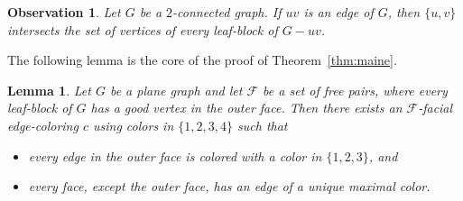 \documentclass[a4paper,12pt]{article}
\newtheorem{lemma}{Lemma}
\newtheorem{observation}{Observation}
\begin{document}
\begin{observation}
	\label{obs:leaves}
	Let $G$ be a $2$-connected graph.
	If $uv$ is an edge of $G$, then $\{u,v\}$ intersects the set of vertices of every leaf-block of $G-uv$.
\end{observation}

The following lemma is the core of the proof of Theorem~\ref{thm:maine}.

\begin{lemma}
	\label{lem:maine}
	Let $G$ be a plane graph and let $\mathcal{F}$ be a set of free pairs,
	where every leaf-block of $G$ has a good vertex in the outer face.
	Then there exists an $\mathcal{F}$-facial edge-coloring $c$ using colors in $\{1,2,3,4\}$ such that
	\begin{itemize}
		\item{} every edge in the outer face is colored with a color in $\{1,2,3\}$, and
		\item{} every face, except the outer face, has an edge of a unique maximal color.
	\end{itemize}
\end{lemma}
\end{document}

